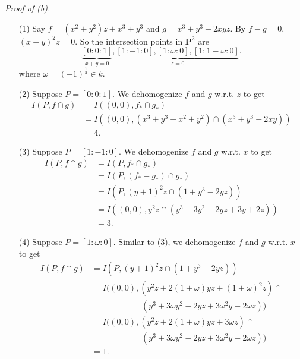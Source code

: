 \documentclass{article}
\begin{document}
\emph{Proof of (b).}
\begin{enumerate}
\item[(1)]
  Say $f = (x^2+y^2)z + x^3 + y^3$ and $g = x^3 + y^3 - 2xyz$.
  By $f - g = 0$, $(x+y)^2z = 0$.
  So the intersection points in $\mathbf{P}^{2}$ are
  \[
    \underbrace{[0:0:1]}_{x+y = 0},
    \underbrace{[1:-1:0], [1:\omega:0], [1:1-\omega:0]}_{z = 0}.
  \]
  where $\omega = (-1)^{\frac{1}{3}} \in k$.

\item[(2)]
  Suppose $P = [0:0:1]$.
  We dehomogenize $f$ and $g$ w.r.t. $z$ to get
  \begin{align*}
    I(P, f \cap g)
    &= I((0,0), f_{*} \cap g_{*}) \\
    &= I((0,0), (x^3+y^3 + x^2+y^2) \cap (x^3 + y^3 - 2xy)) \\
    &= 4.
  \end{align*}

\item[(3)]
  Suppose $P = [1:-1:0]$.
  We dehomogenize $f$ and $g$ w.r.t. $x$ to get
  \begin{align*}
    I(P, f \cap g)
    &= I(P, f_{*} \cap g_{*}) \\
    &= I(P, (f_{*} - g_{*}) \cap g_{*}) \\
    &= I(P, (y+1)^2z \cap (1+y^3 - 2yz)) \\
    &= I((0,0), y^2z \cap (y^3 - 3y^2-2yz + 3y+2z)) \\
    &= 3.
  \end{align*}

\item[(4)]
  Suppose $P = [1:\omega:0]$.
  Similar to (3), we dehomogenize $f$ and $g$ w.r.t. $x$ to get
  \begin{align*}
    I(P, f \cap g)
    &= I(P, (y+1)^2z \cap (1+y^3 - 2yz)) \\
    &= I((0,0), (y^2z + 2(1+\omega)yz + (1+\omega)^2z) \cap \\
      & \qquad\qquad\qquad
      (y^3 + 3\omega y^2 - 2yz + 3\omega^2 y - 2\omega z)) \\
    &= I((0,0), (y^2z + 2(1+\omega)yz + 3\omega z) \cap \\
      & \qquad\qquad\qquad
      (y^3 + 3\omega y^2 - 2yz + 3\omega^2 y - 2\omega z)) \\
    &= 1.
  \end{align*}


\end{enumerate}
\end{document}

